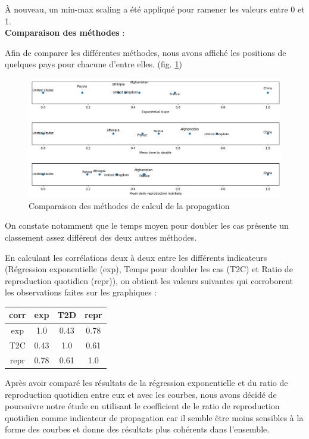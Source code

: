 \documentclass[12pt]{iEEEtran}
\begin{document}
À nouveau, un min-max scaling a été appliqué pour ramener les valeurs entre 0 et 1.
\\

\noindent\textbf{Comparaison des méthodes} :

Afin de comparer les différentes méthodes, nous avons affiché les positions de quelques
pays pour chacune d'entre elles. (fig. \ref{fig:spread_comp})

\begin{figure}[h]
    \centering
    \includegraphics[width=\columnwidth]{img/spread_comp.png}
    \caption{Comparaison des méthodes de calcul de la propagation}

    \label{fig:spread_comp}
\end{figure}

On constate notamment que le temps moyen pour doubler les cas présente un classement assez
différent des deux autres méthodes.

En calculant les corrélations deux à deux entre les différents indicateurs (Régression exponentielle (exp),
Temps pour doubler les cas (T2C) et Ratio de reproduction quotidien (repr)), on obtient les
valeurs suivantes qui corroborent les observations faites sur les graphiques :

\begin{table}[h]
    \centering
    \begin{tabular}{|c|c|c|c|}
        \hline
        corr & exp & T2D & repr \\
        \hline
        exp & 1.0 & 0.43 & 0.78 \\
        T2C & 0.43 & 1.0 & 0.61 \\
        repr & 0.78 & 0.61 & 1.0 \\
        \hline
    \end{tabular}
\end{table}

Après avoir comparé les résultats de la régression exponentielle et du ratio de reproduction
quotidien entre eux et avec les courbes, nous avons décidé de poursuivre notre étude en
utilisant le coefficient de le ratio de reproduction quotidien comme indicateur de propagation
car il semble être moins sensibles à la forme des courbes et donne des résultats plus cohérents
dans l'ensemble.
\end{document}
